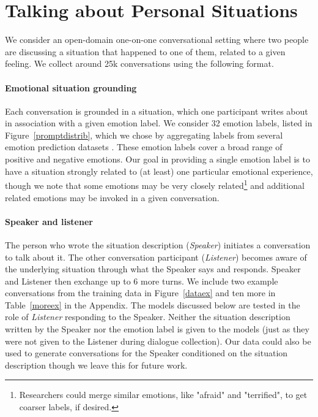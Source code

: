 \documentclass[11pt,a4paper]{article}
\begin{document}
\section{Talking about Personal Situations}

We consider an open-domain one-on-one conversational setting where two people are discussing a situation that happened to one of them, related to a given feeling. We collect around 25k conversations using the following format.

\paragraph{Emotional situation grounding} Each conversation is grounded in a situation, which one participant writes about in association with a given emotion label.
We consider 32 emotion labels, listed in Figure~\ref{promptdistrib}, which we chose by aggregating labels from several emotion prediction datasets \citep{ISEAR,SemEval2007,SkerrySaxe,DailyDialog, MohammadDataset}.  These emotion labels cover a broad range of positive and negative emotions. 
Our goal in providing a single emotion label is to have a situation strongly related to (at least) one particular emotional experience, though we note that some emotions may be very closely related\footnote{Researchers could merge similar emotions, like "afraid" and "terrified", to get coarser labels, if desired.} and additional related emotions may be invoked in a given conversation.

\paragraph{Speaker and listener} The person who wrote the situation description (\textit{Speaker}) initiates a conversation to talk about it. The other conversation participant (\textit{Listener}) becomes aware of the underlying situation through what the Speaker says and responds. Speaker and Listener then exchange up to 6 more turns.
We include two example conversations from the training data in Figure~\ref{dataex} and ten more in Table~\ref{moreex} in the Appendix.
The models discussed below are tested in the role of \textit{Listener} responding to the Speaker. Neither the situation description written by the Speaker nor the emotion label is given to the models (just as they were not given to the Listener during dialogue collection). 
Our data could also be used to generate conversations for the Speaker conditioned on the situation description though we leave this for future work.
\end{document}
